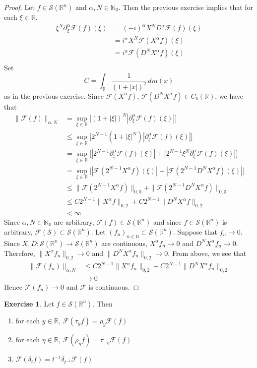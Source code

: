 \documentclass[12pt]{amsart}
\theoremstyle{definition}
\newtheorem{ex}[definition]{Exercise}
\newcommand{\p}{\partial}
\newcommand{\al}{\alpha}
\newcommand{\del}{\delta}
\newcommand{\N}{\mathbb{N}}
\newcommand{\R}{\mathbb{R}}
\newcommand{\MF}{\mathcal{F}}
\newcommand{\MS}{\mathcal{S}}
\newcommand{\dm}{\, d m}
\begin{document}
	\begin{proof}
		Let $f \in \MS(\R^n)$ and $\al, N \in \N_0$. Then the previous exercise implies that for each $\xi \in \R$,
		\begin{align*}
			\xi^{N}\p_{\xi}^{\al} \MF(f)(\xi)
			& =  (-i)^{\al} X^{N} D^{\al} \MF(f)(\xi) \\
			&= i^{\al} X^N \MF(X^{\al} f)(\xi) \\
			&= i^{\al} \MF(D^{N} X^{\al} f)(\xi) \\ 
		\end{align*}
		Set 
		$$C = \int_{\R} \frac{1}{(1+|x|)^2} \dm(x)$$ 
		as in the previous exercise. Since $\MF(X^{\al}f)$, $\MF(D^NX^{\al}f) \in C_b(\R)$, we have that
		\begin{align*}
			\|\MF(f)\|_{\al, N}
			& = \sup_{\xi \in \R} \bigg[ (1 + |\xi|)^N |\p_{\xi}^{\al} \MF(f)(\xi)|\bigg] \\
			& \leq \sup_{\xi \in \R} \bigg[ 2^{N-1}(1 + |\xi|^N) |\p_{\xi}^{\al} \MF(f)(\xi)| \bigg] \\
			& = \sup_{\xi \in \R} \bigg[ |2^{N-1} \p_{\xi}^{\al} \MF(f)(\xi)| + |2^{N-1}\xi^N \p_{\xi}^{\al} \MF(f)(\xi)| \bigg] \\
			& = \sup_{\xi \in \R} \bigg[  |\MF( 2^{N-1} X^{\al} f)(\xi)| + |\MF(2^{N-1} D^N X^{\al} f)(\xi)| \bigg] \\
			& \leq  \| \MF( 2^{N-1} X^{\al} f) \|_{0,0} + \| \MF(2^{N-1} D^N X^{\al} f)\|_{0,0} \\
			& \leq C2^{N-1}\| X^{\al} f \|_{0,2} +  C2^{N-1}\|  D^N X^{\al} f\|_{0,2} \\
			& < \infty
		\end{align*}
		Since $\al, N \in \N_0$ are arbitrary, $\MF(f) \in \MS(\R^n)$ and since $f \in \MS(\R^n)$ is arbitrary, $\MF(\MS) \subset \MS(\R^n)$. Let $(f_n)_{n \in \N} \subset \MS(\R^n)$. Suppose that $f_n \rightarrow 0$. Since $X,D: \MS(\R^n) \rightarrow \MS(\R^n)$ are continuous, $X^{\al}f_n \rightarrow 0$ and $D^NX^\al f_n \rightarrow 0$. Therefore, $\|X^{\al}f_n\|_{0, 2} \rightarrow 0$ and $\|D^NX^{\al}f_n\|_{0, 2} \rightarrow 0$. From above, we see that 
		\begin{align*}
			\|\MF(f_n)\|_{\al, N} 
			& \leq C2^{N-1}\| X^{\al} f_n \|_{0,2} +  C2^{N-1}\|  D^N X^{\al} f_n \|_{0,2} \\
			& \rightarrow 0
		\end{align*}
		Hence $\MF(f_n) \rightarrow 0$ and $\MF$ is continuous. 
	\end{proof}

	\begin{ex}
		Let $f \in \MS(\R^n)$. Then 
		\begin{enumerate}
			\item for each $y \in \R$, $\MF(\tau_yf) = \rho_{y} \MF(f)$ 
			\item for each $\eta \in \R$, $\MF(\rho_{\eta} f) = \tau_{-\eta} \MF(f)$
			\item $\MF(\del_t f) = t^{-1} \del_{t^{-1}} \MF(f)$
		\end{enumerate}
	\end{ex}
\end{document}

